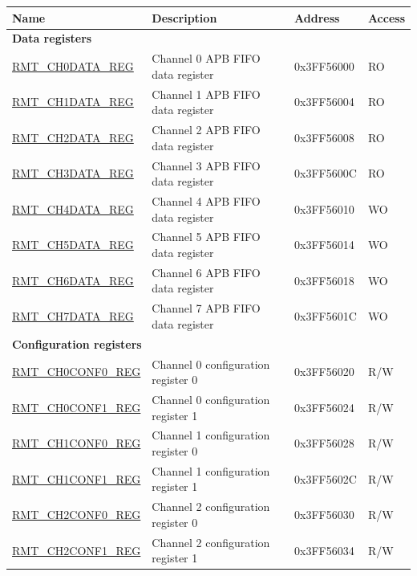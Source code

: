 \begin{longtable}{ |p{5cm}|p{6.6cm}|p{2.2cm}|p{1.2cm}| }

\hline\rowcolor{lightgray}
Name & Description &  Address & Access \\ \hline
\multicolumn{4}{|l|}{\textbf{Data registers}} \\ \hline
\hyperref[regdesc:RMTCHnDATAREG]{RMT\_CH0DATA\_REG} & Channel 0 APB FIFO data register & 0x3FF56000 & RO \\ \hline
\hyperref[regdesc:RMTCHnDATAREG]{RMT\_CH1DATA\_REG} & Channel 1 APB FIFO data register & 0x3FF56004 & RO \\ \hline
\hyperref[regdesc:RMTCHnDATAREG]{RMT\_CH2DATA\_REG} & Channel 2 APB FIFO data register & 0x3FF56008 & RO \\ \hline
\hyperref[regdesc:RMTCHnDATAREG]{RMT\_CH3DATA\_REG} & Channel 3 APB FIFO data register & 0x3FF5600C & RO \\ \hline
\hyperref[regdesc:RMTCHMDATAREG]{RMT\_CH4DATA\_REG} & Channel 4 APB FIFO data register & 0x3FF56010 & WO \\ \hline
\hyperref[regdesc:RMTCHMDATAREG]{RMT\_CH5DATA\_REG} & Channel 5 APB FIFO data register & 0x3FF56014 & WO \\ \hline
\hyperref[regdesc:RMTCHMDATAREG]{RMT\_CH6DATA\_REG} & Channel 6 APB FIFO data register & 0x3FF56018 & WO \\ \hline
\hyperref[regdesc:RMTCHMDATAREG]{RMT\_CH7DATA\_REG} & Channel 7 APB FIFO data register & 0x3FF5601C & WO \\ \hline
\multicolumn{4}{|l|}{\textbf{Configuration registers}} \\ \hline
\hyperref[regdesc:RMTCHnCONF0REG]{RMT\_CH0CONF0\_REG} & Channel 0 configuration register 0 & 0x3FF56020 & R/W \\ \hline
\hyperref[regdesc:RMTCHnCONF1REG]{RMT\_CH0CONF1\_REG} & Channel 0 configuration register 1 & 0x3FF56024 & R/W \\ \hline
\hyperref[regdesc:RMTCHnCONF0REG]{RMT\_CH1CONF0\_REG} & Channel 1 configuration register 0 & 0x3FF56028 & R/W \\ \hline
\hyperref[regdesc:RMTCHnCONF1REG]{RMT\_CH1CONF1\_REG} & Channel 1 configuration register 1 & 0x3FF5602C & R/W \\ \hline
\hyperref[regdesc:RMTCHnCONF0REG]{RMT\_CH2CONF0\_REG} & Channel 2 configuration register 0 & 0x3FF56030 & R/W \\ \hline
\hyperref[regdesc:RMTCHnCONF1REG]{RMT\_CH2CONF1\_REG} & Channel 2 configuration register 1 & 0x3FF56034 & R/W \\ \hline

\end{longtable}
